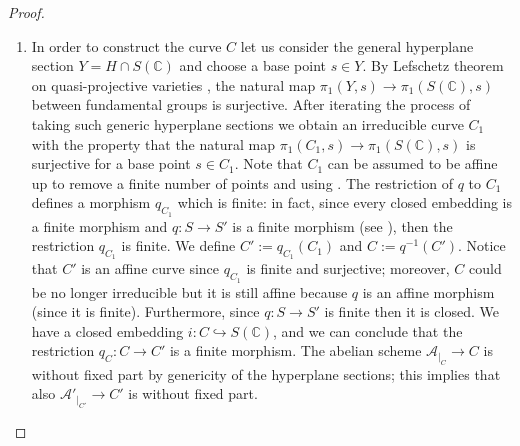 \documentclass[10 pt,a4paper]{article}
\theoremstyle{plain}
\theoremstyle{definition}
\theoremstyle{named}
\newcommand{\cA}{\mathcal A}
\newcommand{\bC}{\mathbb C}
\begin{document}
\begin{proof}
    \begin{enumerate}
        \item[$(i)$] In order to construct the curve $C$ let us consider the general hyperplane section $Y=H \cap S(\bC)$ and choose a base point $s \in Y$. By Lefschetz theorem on quasi-projective varieties \cite[Part II, 1.2, Theorem]{GorMac}, the natural map $\pi_1(Y,s) \to \pi_1(S(\bC),s)$ between fundamental groups is surjective. After iterating the process of taking such generic hyperplane sections we obtain an irreducible curve $C_1$ with the property that the natural map $\pi_1(C_1,s) \to \pi_1(S(\bC),s)$ is surjective for a base point $s \in C_1$. Note that $C_1$ can be assumed to be affine up to remove a finite number of points and using \cite[Proposition 2.10]{kol}. The restriction of $q$ to $C_1$ defines a morphism $q_{C_1}$ which is finite: in fact, since every closed embedding is a finite morphism and $q:S \to S'$ is a finite morphism (see ), then the restriction $q_{C_1}$ is finite. We define $C':=q_{C_1}(C_1)$ and $C:=q^{-1}(C')$. Notice that $C'$ is an affine curve since $q_{C_1}$ is finite and surjective; moreover, $C$ could be no longer irreducible but it is still affine because $q$ is an affine morphism (since it is finite). Furthermore, since $q:S \to S'$ is finite then it is closed. We have a closed embedding $i:C \hookrightarrow S(\bC)$, and we can conclude that the restriction $q_C:C \to C'$ is a finite morphism. The abelian scheme $\cA_{|_C} \to C$ is without fixed part by genericity of the hyperplane sections; this implies that also $\cA'_{|_{C'}} \to C'$ is without fixed part.
        



\end{enumerate}
\end{proof}
\end{document}

